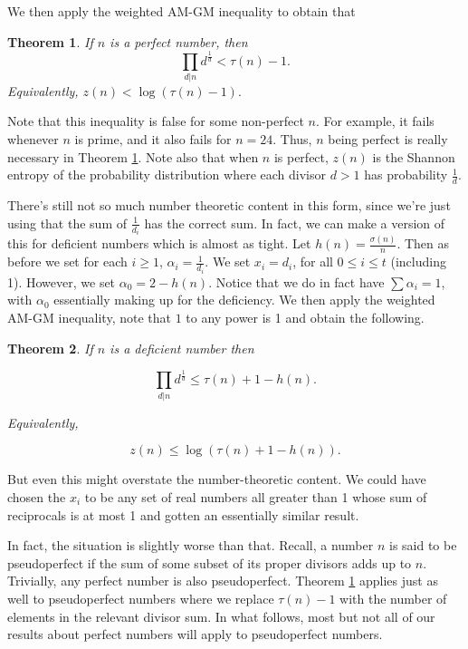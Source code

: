 \documentclass{article}
\newtheorem{theorem}{Theorem}
\begin{document}
We then apply the weighted AM-GM inequality to obtain that

\begin{theorem} If $n$ is a perfect number, then
$$\prod_{d|n} d^{\frac{1}{d}} < \tau(n)-1.$$
Equivalently, 
 $z(n) < \log (\tau(n)-1).$ \label{tau lower bound for perfect form}
\end{theorem}

Note that this inequality is false for some non-perfect $n$. For example, it fails whenever $n$ is prime, and it also fails for $n=24$. Thus, $n$ being perfect is really necessary in Theorem \ref{tau lower bound for perfect form}.  Note also that when $n$ is perfect, $z(n)$ is the Shannon entropy of the probability distribution where each divisor $d>1$ has probability $\frac{1}{d}$.


There's still not so much number theoretic content in this form, since we're just using that the sum of $\frac{1}{d_i}$ has the correct sum. In fact, we can make a version of this for deficient numbers which is almost as tight. Let $h(n)=\frac{\sigma(n)}{n}.$ Then as before we set for each $i \geq 1$, $\alpha_i=\frac{1}{d_i}$. We set $x_i = d_i$, for all $0 \leq i \leq t $ (including 1). However, we set $\alpha_0 =2 - h(n)$. Notice that we do in fact have $\sum \alpha_i =1$, with $\alpha_0$ essentially making up for the deficiency. We then apply the weighted AM-GM inequality, note that $1$ to any power is 1 and obtain the following.

\begin{theorem} If $n$ is a deficient number then 

$$\prod_{d|n} d^{\frac{1}{d}} \leq \tau(n) + 1 - h(n).$$

Equivalently,

$$z(n) \leq \log \left(\tau(n) + 1 - h(n) \right) .$$
\end{theorem}

But even this might overstate the number-theoretic content. We could have chosen the $x_i$ to be any set of real numbers all greater than 1 whose sum of reciprocals is at most 1 and gotten an essentially similar result. 

In fact, the situation is slightly worse than that. Recall, a number $n$ is said to be pseudoperfect if the sum of some subset of its proper divisors  adds up to $n$.  Trivially, any perfect number is also pseudoperfect. Theorem \ref{tau lower bound for perfect form} applies just as well to pseudoperfect numbers where we replace $\tau(n)-1$ with the number of elements in the relevant divisor sum. In what follows, most but not all of our results about perfect numbers will apply to pseudoperfect numbers. 
\end{document}
